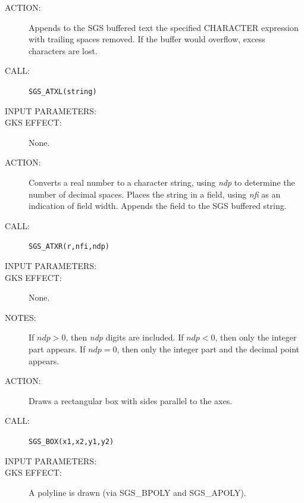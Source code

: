 \documentclass[11pt]{article}
\newcommand{\htmlref}[2]{#1}
\begin{document}
\begin{description}
\item [ACTION:]
Appends to the SGS buffered text the specified CHARACTER expression with
trailing spaces removed.
If the buffer would overflow, excess characters are lost.
\item [CALL:]
{\tt SGS\_ATXL(string)}
\item [INPUT PARAMETERS:]
\begin{params}
\end{params}
\item [GKS EFFECT:]
None.
\end{description}
\goodbreak

\begin{description}
\item [ACTION:]
Converts a real number to a character string, using {\em ndp}\/ to determine the
number of decimal spaces.
Places the string in a field, using {\em nfi}\/ as an indication of field width.
Appends the field to the SGS buffered string.
\item [CALL:]
{\tt SGS\_ATXR(r,nfi,ndp)}
\item [INPUT PARAMETERS:]
\begin{params}
\end{params}
\item [GKS EFFECT:]
None.
\item [NOTES:]
If $\mathit{ndp}>0$, then {\it ndp}\/ digits are included.
If $\mathit{ndp}<0$, then only the integer part appears.
If $\mathit{ndp}=0$, then only the integer part and the decimal point appears.
\end{description}
\goodbreak

\begin{description}
\item [ACTION:]
Draws a rectangular box with sides parallel to the axes.
\item [CALL:]
{\tt SGS\_BOX(x1,x2,y1,y2)}
\item [INPUT PARAMETERS:]
\begin{params}
\end{params}
\item [GKS EFFECT:]
A polyline is drawn (via \htmlref{SGS\_BPOLY}{SGS_BPOLY} and 
\htmlref{SGS\_APOLY}{SGS_APOLY}).
\end{description}
\goodbreak
\end{document}
